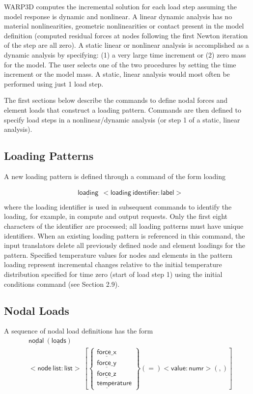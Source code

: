 \documentclass[11pt]{report}
\numberwithin{equation}{section}
\newcommand{\noi}{\noindent}
\newcommand{\ul} {\underline}
\newcommand{\hv} {\mathsf}   %
\begin{document}
WARP3D computes the incremental solution for each load step 
assuming the model response is dynamic and nonlinear. 
A linear dynamic analysis has no material nonlinearities, geometric 
nonlinearities or contact present in the model
definition (computed residual forces at nodes following the first
Newton iteration of the step are all zero). A static linear or nonlinear analysis is accomplished as a 
dynamic analysis by specifying: (1) a very large time increment or (2) zero mass 
for the model. The user selects one
of the two procedures by setting the time increment or the model mass. A static, linear
analysis would most often be performed using just 1 load step.

The first sections below describe the commands to define nodal forces and element loads that
construct a loading pattern. Commands are then defined to specify load steps in a 
nonlinear/dynamic analysis (or step 1 of a static, linear analysis).


\subsection{Loading Patterns}
\noi  A new loading pattern is defined through a command of the form
loading

\begin{align*}
& \hv{\ul{loading}}\ \ \hv{<loading\ identifier:label>}\\
\end{align*}
\noi where the loading identifier is used in subsequent commands to identify the loading, for
example, in compute and output requests. Only the first eight characters of the identifier
are processed; all loading patterns must have unique identifiers.
When an existing loading pattern is referenced in this command, the input translators
delete all previously defined node and element loadings for the pattern.
Specified temperature values for nodes and elements in the pattern loading represent
incremental changes relative to the initial temperature distribution specified for time zero
(start of load step 1) using the initial conditions command (see Section 2.9).


\subsection{Nodal Loads}
\noi  A sequence of nodal load definitions has the form
\begin{align*}
& \hv{\ul{nodal}\ (\ul{loads})} \\
&\hv{<node\ list:list>}\ \left [
\begin{Bmatrix}
\hv{  \ul{force\_x}} \\ \hv{\ul{force\_y}}  \\ \hv{\ul{force\_z}} \\ \hv{\ul{temper}ature}
\end{Bmatrix}
\hv{(=)<value:numr>}(,) \right ]
\end{align*}
\end{document}
